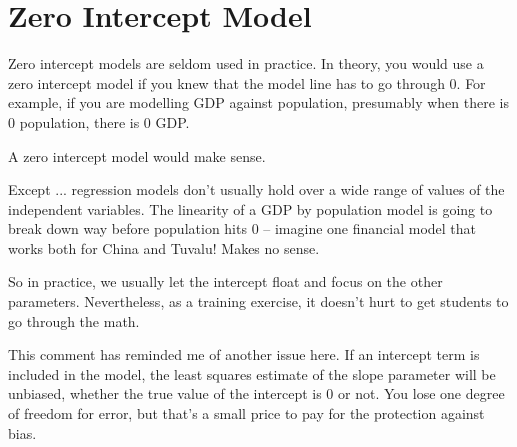 \documentclass[MASTER.tex]{subfiles}
\begin{document}
\newpage
\section{Zero Intercept Model}
Zero intercept models are seldom used in practice. 
In theory, you would use a zero intercept model if you knew that the model line has to go through 0. 
For example, if you are modelling GDP against population, presumably when there is 0 population, there is 0 GDP. 

A zero intercept model would make sense.

Except ... regression models don't usually hold over a wide range of values of the independent variables. 
The linearity of a GDP by population model is going to break down way before population hits 0 -- imagine one financial model that works both for China and Tuvalu! Makes no sense.

So in practice, we usually let the intercept float and focus on the other parameters. 
Nevertheless, as a training exercise, it doesn't hurt to get students to go through the math.

This comment has reminded me of another issue here. 
If an intercept term is included in the model, the least squares estimate of the slope parameter will be unbiased, whether the true value of the intercept is 0 or not. 
You lose one degree of freedom for error, but that's a small price to pay for the protection against bias.
\end{document}

